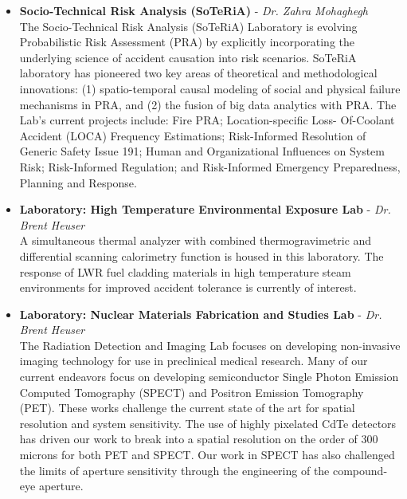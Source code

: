 \documentclass[12pt, letterpaper]{article}
\begin{document}
\begin{itemize}
  \item \textbf{Socio-Technical Risk Analysis (SoTeRiA)} - \textit{Dr. Zahra Mohaghegh}\\
  The Socio-Technical Risk Analysis (SoTeRiA) Laboratory is evolving Probabilistic Risk Assessment (PRA) by explicitly incorporating the underlying science of accident causation into risk scenarios. SoTeRiA laboratory has pioneered two key areas of theoretical and methodological innovations: (1) spatio-temporal causal modeling of social and physical failure mechanisms in PRA, and (2) the fusion of big data analytics with PRA. The Lab’s current projects include: Fire PRA; Location-specific Loss- Of-Coolant Accident (LOCA) Frequency Estimations; Risk-Informed Resolution of Generic Safety Issue 191; Human and Organizational Influences on System Risk; Risk-Informed Regulation; and Risk-Informed Emergency Preparedness, Planning and Response.

  \item \textbf{Laboratory: High Temperature Environmental Exposure Lab} - \textit{Dr. Brent Heuser}\\
  A simultaneous thermal analyzer with combined thermogravimetric and differential scanning calorimetry function is housed in this laboratory. The response of LWR fuel cladding materials in high temperature steam environments for improved accident tolerance is currently of interest.

  \item \textbf{Laboratory: Nuclear Materials Fabrication and Studies Lab} - \textit{Dr. Brent Heuser}\\
  The Radiation Detection and Imaging Lab focuses on developing non-invasive imaging technology for use in preclinical medical research. Many of our current endeavors focus on developing semiconductor Single Photon Emission Computed Tomography (SPECT) and Positron Emission Tomography (PET). These works challenge the current state of the art for spatial resolution and system sensitivity. The use of highly pixelated CdTe detectors has driven our work to break into a spatial resolution on the order of 300 microns for both PET and SPECT. Our work in SPECT has also challenged the limits of aperture sensitivity through the engineering of the compound-eye aperture.
\end{itemize}
\end{document}

